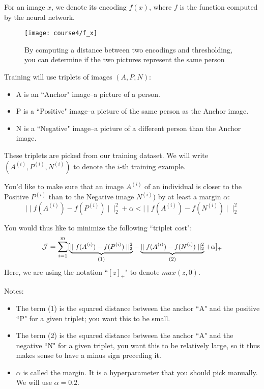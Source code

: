 For an image $x$, we denote its encoding $f(x)$, where $f$ is the function computed by the neural network.
\begin{figure}[h]
\begin{center}
\texttt{[image: course4/f\_x]}
\caption{By computing a distance between two encodings and thresholding, you can determine if the two pictures represent the same person}
\end{center}
\end{figure}

Training will use triplets of images $(A, P, N)$:  
\begin{itemize}
\item A is an ``Anchor" image--a picture of a person. 
\item P is a ``Positive" image--a picture of the same person as the Anchor image.
\item N is a ``Negative" image--a picture of a different person than the Anchor image.
\end{itemize}

These triplets are picked from our training dataset. We will write $(A^{(i)}, P^{(i)}, N^{(i)})$ to denote the $i$-th training example. 

You'd like to make sure that an image $A^{(i)}$ of an individual is closer to the Positive $P^{(i)}$ than to the Negative image $N^{(i)}$) by at least a margin $\alpha$:
\begin{equation*}
\mid \mid f(A^{(i)}) - f(P^{(i)}) \mid \mid_2^2 + \alpha < \mid \mid f(A^{(i)}) - f(N^{(i)}) \mid \mid_2^2
\end{equation*}

You would thus like to minimize the following ``triplet cost":
\begin{equation}\label{triplet}
\mathcal{J} = \sum^{m}_{i=1} \large[ \small \underbrace{\mid \mid f(A^{(i)}) - f(P^{(i)}) \mid \mid_2^2}_\text{(1)} - \underbrace{\mid \mid f(A^{(i)}) - f(N^{(i)}) \mid \mid_2^2}_\text{(2)} + \alpha \large ] \small_+
\end{equation}
Here, we are using the notation ``$[z]_+$" to denote $max(z,0)$.  

Notes:
\begin{itemize}
\item The term (1) is the squared distance between the anchor ``A" and the positive ``P" for a given triplet; you want this to be small. 
\item The term (2) is the squared distance between the anchor ``A" and the negative ``N" for a given triplet, you want this to be relatively large, so it thus makes sense to have a minus sign preceding it. 
\item $\alpha$ is called the margin. It is a hyperparameter that you should pick manually. We will use $\alpha = 0.2$. 
\end{itemize}

